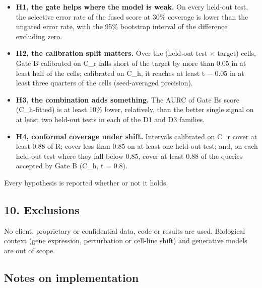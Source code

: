\begin{itemize}
\tightlist
\item
  \textbf{H1, the gate helps where the model is weak.} On every held-out
  test, the selective error rate of the fused score at 30\% coverage is
  lower than the ungated error rate, with the 95\% bootstrap interval of
  the difference excluding zero.
\item
  \textbf{H2, the calibration split matters.} Over the (held-out test ×
  target) cells, Gate B calibrated on C\_r falls short of the target by
  more than 0.05 in at least half of the cells; calibrated on C\_h, it
  reaches at least t − 0.05 in at least three quarters of the cells
  (seed-averaged precision).
\item
  \textbf{H3, the combination adds something.} The AURC of Gate
  B\textquotesingle s score (C\_h-fitted) is at least 10\% lower,
  relatively, than the better single signal on at least two held-out
  tests in each of the D1 and D3 families.
\item
  \textbf{H4, conformal coverage under shift.} Intervals calibrated on
  C\_r cover at least 0.88 of R; cover less than 0.85 on at least one
  held-out test; and, on each held-out test where they fall below 0.85,
  cover at least 0.88 of the queries accepted by Gate B (C\_h, t = 0.8).
\end{itemize}

Every hypothesis is reported whether or not it holds.

\hypertarget{10-exclusions}{%
\subsection{10. Exclusions}\label{10-exclusions}}

No client, proprietary or confidential data, code or results are used.
Biological context (gene expression, perturbation or cell-line shift)
and generative models are out of scope.

\hypertarget{notes-on-implementation}{%
\subsection{Notes on implementation}\label{notes-on-implementation}}

